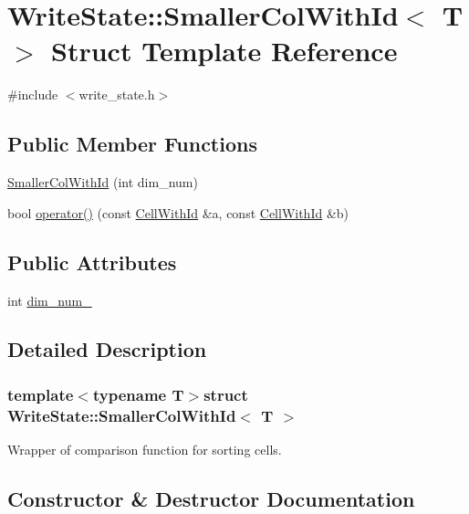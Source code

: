 \hypertarget{structWriteState_1_1SmallerColWithId}{}\section{Write\+State\+:\+:Smaller\+Col\+With\+Id$<$ T $>$ Struct Template Reference}
\label{structWriteState_1_1SmallerColWithId}


{\ttfamily \#include $<$write\+\_\+state.\+h$>$}

\subsection*{Public Member Functions}
\begin{DoxyCompactItemize}
\item 
\hyperlink{structWriteState_1_1SmallerColWithId_a9c351894e7b5e0e972ab67ddc8ab87c2}{Smaller\+Col\+With\+Id} (int dim\+\_\+num)
\item 
bool \hyperlink{structWriteState_1_1SmallerColWithId_a053a771567a2f5193fb8c27d1b9d381d}{operator()} (const \hyperlink{structWriteState_1_1CellWithId}{Cell\+With\+Id} \&a, const \hyperlink{structWriteState_1_1CellWithId}{Cell\+With\+Id} \&b)
\end{DoxyCompactItemize}
\subsection*{Public Attributes}
\begin{DoxyCompactItemize}
\item 
int \hyperlink{structWriteState_1_1SmallerColWithId_a607c277cc7996a739d6b0a09e7cc883c}{dim\+\_\+num\+\_\+}
\end{DoxyCompactItemize}


\subsection{Detailed Description}
\subsubsection*{template$<$typename T$>$struct Write\+State\+::\+Smaller\+Col\+With\+Id$<$ T $>$}

Wrapper of comparison function for sorting cells. 

\subsection{Constructor \& Destructor Documentation}
\hypertarget{structWriteState_1_1SmallerColWithId_a9c351894e7b5e0e972ab67ddc8ab87c2}{}
